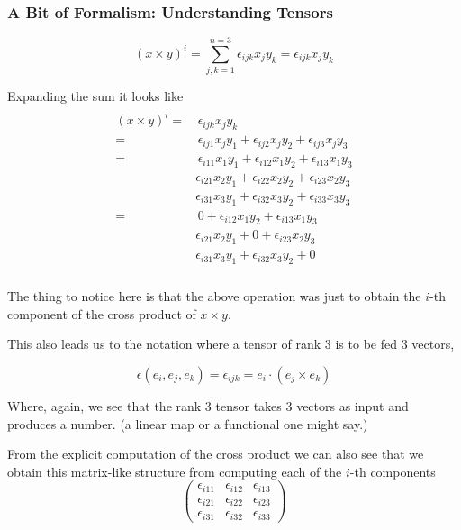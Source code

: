 \subsubsection{A Bit of Formalism: Understanding Tensors}

$$
\left( x \times y \right)^i = \sum_{j,k=1}^{n=3} \epsilon_{ijk} x_j y_k = \epsilon_{ijk} x_j y_k
$$

Expanding the sum it looks like
\begin{align}
    \begin{split}
\left( x \times y \right)^i =& \, \epsilon_{ijk} x_j y_k \\
=& \, \epsilon_{ij1} x_j y_1 + \epsilon_{ij2} x_j y_2 + \epsilon_{ij3} x_j y_3 \\
=& \, \epsilon_{i11} x_1 y_1 + \epsilon_{i12} x_1 y_2 + \epsilon_{i13} x_1 y_3 \\
    & \epsilon_{i21} x_2 y_1 + \epsilon_{i22} x_2 y_2 + \epsilon_{i23} x_2 y_3 \\
    & \epsilon_{i31} x_3 y_1 + \epsilon_{i32} x_3 y_2 + \epsilon_{i33} x_3 y_3 \\
=& \, 0 + \epsilon_{i12} x_1 y_2 + \epsilon_{i13} x_1 y_3 \\
    & \epsilon_{i21} x_2 y_1 + 0 + \epsilon_{i23} x_2 y_3 \\
    & \epsilon_{i31} x_3 y_1 + \epsilon_{i32} x_3 y_2 + 0 \\
    \end{split}
\end{align} \label{tensors:levi-civita-component-i}

The thing to notice here is that the above operation was just to obtain the $i$-th component of the cross product
of $x \times y$.

This also leads us to the notation where a tensor of rank 3 is to be fed 3 vectors,

$$
\epsilon (e_i, e_j, e_k) = \epsilon_{ijk} = e_i \cdot (e_j \times e_k)
$$

Where, again, we see that the rank 3 tensor takes 3 vectors as input and produces a number.
(a linear map or a functional one might say.)

From the explicit computation of the cross product we can also see that we obtain this matrix-like
structure from computing each of the $i$-th components
$$
\begin{pmatrix}
\epsilon_{i11} & \epsilon_{i12} & \epsilon_{i13} \\
\epsilon_{i21} & \epsilon_{i22} & \epsilon_{i23} \\
\epsilon_{i31} & \epsilon_{i32} & \epsilon_{i33}
\end{pmatrix}
$$

